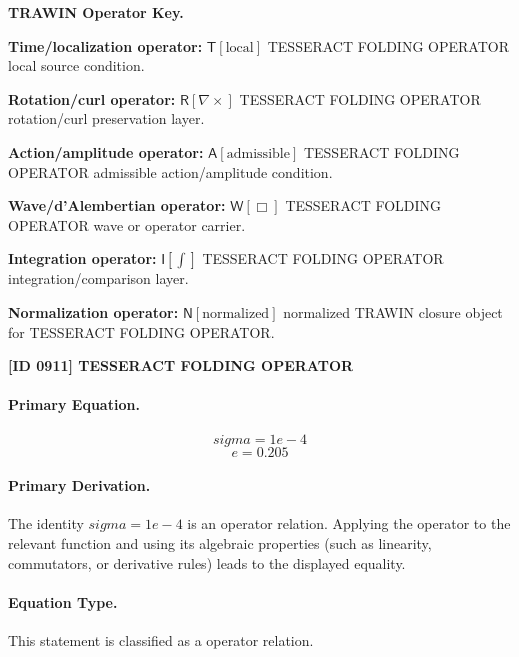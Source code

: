 \par\vspace{0.45\baselineskip}
\noindent\begin{minipage}[t]{\linewidth}
\begingroup
\small
\raggedright
\textbf{TRAWIN Operator Key.}\par
\noindent\textbf{Time/localization operator:} $\mathsf{T}\!\left[\mathrm{local}\right]$ TESSERACT FOLDING OPERATOR local source condition.\par
\noindent\textbf{Rotation/curl operator:} $\mathsf{R}\!\left[\nabla\times\right]$ TESSERACT FOLDING OPERATOR rotation/curl preservation layer.\par
\noindent\textbf{Action/amplitude operator:} $\mathsf{A}\!\left[\mathrm{admissible}\right]$ TESSERACT FOLDING OPERATOR admissible action/amplitude condition.\par
\noindent\textbf{Wave/d'Alembertian operator:} $\mathsf{W}\!\left[\Box\right]$ TESSERACT FOLDING OPERATOR wave or operator carrier.\par
\noindent\textbf{Integration operator:} $\mathsf{I}\!\left[\int\right]$ TESSERACT FOLDING OPERATOR integration/comparison layer.\par
\noindent\textbf{Normalization operator:} $\mathsf{N}\!\left[\mathrm{normalized}\right]$ normalized TRAWIN closure object for TESSERACT FOLDING OPERATOR.\par
\endgroup
\end{minipage}

\clearpage
\noindent\textbf{[ID 0911] TESSERACT FOLDING OPERATOR}\par
\vspace{0.35em}
\paragraph{Primary Equation.}
\[
sigma = 1e-4
\]
\[
e=0.205
\]

\paragraph{Primary Derivation.}
The identity \( sigma = 1e-4 \) is an operator relation. Applying the operator to the relevant function and using its algebraic properties (such as linearity, commutators, or derivative rules) leads to the displayed equality.
\paragraph{Equation Type.}
This statement is classified as a operator relation.

